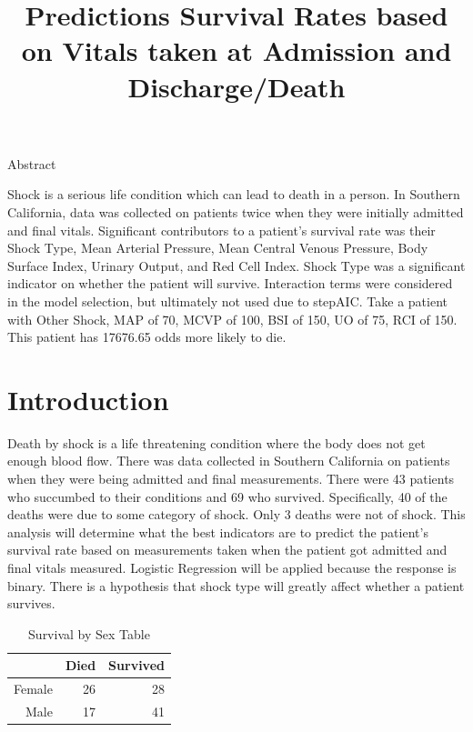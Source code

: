 \documentclass{article}\usepackage[]{graphicx}\usepackage[]{color}
\title{Predictions Survival Rates based on Vitals 
taken at Admission and Discharge/Death}
\author{}
\begin{document}
 

\maketitle
\begin{center}
\Large{Abstract}
\end{center}
\qquad Shock is a serious life condition which can lead to death in a person. In Southern California, data was collected on patients twice when they were initially admitted and final vitals. Significant contributors to a patient's survival rate was their Shock Type, Mean Arterial Pressure, Mean Central Venous Pressure, Body Surface Index, Urinary Output, and Red Cell Index. Shock Type was a significant indicator on whether the patient will survive. Interaction terms were considered in the model selection, but ultimately not used due to stepAIC. Take a patient with Other Shock, MAP of 70, MCVP of 100, BSI of 150, UO of 75, RCI of 150. This patient has 17676.65 odds more likely to die.
\section{Introduction}
\qquad Death by shock is a life threatening condition where the body does not get enough blood flow. There was data collected in Southern California on patients when they were being admitted and final measurements. There were 43 patients who succumbed to their conditions and 69 who survived. Specifically, 40 of the deaths were due to some category of shock. Only 3 deaths were not of shock. This analysis will determine what the best indicators are to predict the patient's survival rate based on measurements taken when the patient got admitted and final vitals measured. Logistic Regression will be applied because the response is binary. There is a hypothesis that shock type will greatly affect whether a patient survives.

\begin{table}[ht]
\centering
\caption{Survival by Sex Table}
\label{sex}
\begin{tabular}{rrr}
  \hline
 & Died & Survived \\ 
  \hline
Female &  26 &  28 \\ 
  Male &  17 &  41 \\ 
   \hline
\end{tabular}
\end{table}
\end{document}

